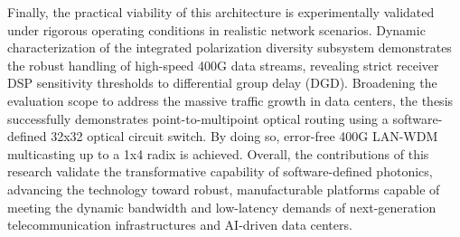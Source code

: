 Finally, the practical viability of this architecture is experimentally validated under rigorous 
operating conditions in realistic network scenarios. Dynamic characterization of the integrated 
polarization diversity subsystem demonstrates the robust handling of high-speed 400G data streams, 
revealing strict receiver DSP sensitivity thresholds to differential group delay (DGD). Broadening 
the evaluation scope to address the massive traffic growth in data centers, the thesis successfully 
demonstrates point-to-multipoint optical routing using a software-defined 32x32 optical circuit 
switch. By doing so, error-free 400G LAN-WDM multicasting up to a 1x4 radix is achieved. Overall, 
the contributions of this research validate the transformative capability of software-defined 
photonics, advancing the technology toward robust, manufacturable platforms capable of meeting the 
dynamic bandwidth and low-latency demands of next-generation telecommunication infrastructures and 
AI-driven data centers.

